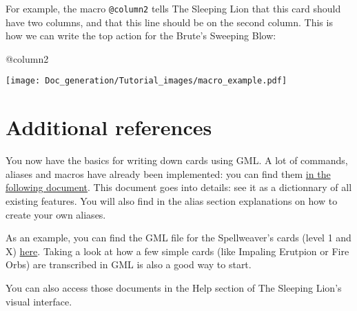 \documentclass{article}
\begin{document}
For example, the macro \verb#@column2# tells The Sleeping Lion that this card should have two columns, and that this line should be on the second column. This is how we can write the top action for the Brute's Sweeping Blow:

\begin{minipage}{0.6\linewidth}
\raggedright
\begin{spverbatim}
@column2 \end{spverbatim}
\end{minipage}
\begin{minipage}{0.5\linewidth}
\raggedleft
\texttt{[image: Doc\_generation/Tutorial\_images/macro\_example.pdf]}
\end{minipage}


\section{Additional references}
You now have the basics for writing down cards using GML. A lot of commands, aliases and macros have already been implemented: you can find them \href{available_functions.pdf}{in the following document}. This document goes into details: see it as a dictionnary of all existing features. You will also find in the alias section explanations on how to create your own aliases.

As an example, you can find the GML file for the Spellweaver's cards (level 1 and X) \href{Spellweaver.gml}{here}. Taking a look at how a few simple cards (like Impaling Erutpion or Fire Orbs) are transcribed in GML is also a good way to start.

You can also access those documents in the Help section of The Sleeping Lion's visual interface.
\end{document}

